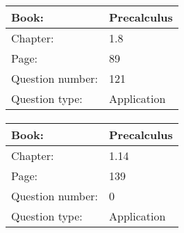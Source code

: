 \documentclass{article}
\begin{document}
            \paragraph{}
            \begin{tabularx}{1\textwidth}{
                    p{}
                    p{}
                }
                \toprule
                Book: & Precalculus
                \\
                \midrule
                Chapter: & 1.8
                \\
                \midrule
                Page: & 89
                \\
                \midrule
                Question number: & 121
                \\
                \midrule
                Question type: & Application
                \\
                \bottomrule
            \end{tabularx}
            
            \paragraph{}
            \begin{tabularx}{1\textwidth}{
                    p{}
                    p{}
                }
                \toprule
                Book: & Precalculus
                \\
                \midrule
                Chapter: & 1.14
                \\
                \midrule
                Page: & 139
                \\
                \midrule
                Question number: & 0
                \\
                \midrule
                Question type: & Application
                \\
                \bottomrule
            \end{tabularx}
            
\end{document}
